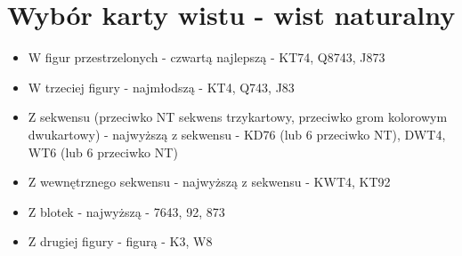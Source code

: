 \documentclass{article}
\begin{document}
    \section{Wybór karty wistu - wist naturalny}
    	\begin{itemize}
    	\item W figur przestrzelonych - czwartą najlepszą - KT7{\color{red}4}, Q87{\color{red}4}3, J87{\color{red}3}
    	\item W trzeciej figury - najmłodszą - KT{\color{red}4}, Q7{\color{red}4}3, J8{\color{red}3}
    	\item Z sekwensu (przeciwko NT sekwens trzykartowy, przeciwko grom kolorowym dwukartowy) - najwyższą z sekwensu - {\color{red}K}D76 (lub 6 przeciwko NT), {\color{red}D}WT4, {\color{red}W}T6 (lub 6 przeciwko NT)
    	\item Z wewnętrznego sekwensu - najwyższą z sekwensu - K{\color{red}W}T4, K{\color{red}T}92
    	\item Z blotek - najwyższą - {\color{red}7}643, {\color{red}9}2, {\color{red}8}73
    	\item Z drugiej figury - figurą - {\color{red}K}3, {\color{red}W}8
    	\end{itemize}
\end{document}
